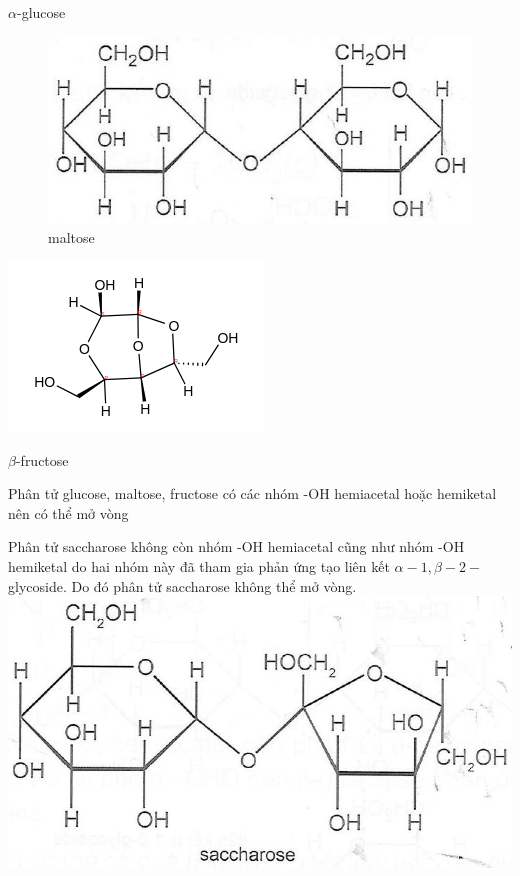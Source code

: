 \documentclass[10pt]{article}
\begin{document}
$\alpha$-glucose

\begin{figure}[h]
\begin{center}
  \includegraphics[width=\textwidth]{2025_10_23_b4e16b74380d0f7e7700g-038}
\captionsetup{labelformat=empty}
\caption{maltose}
\end{center}
\end{figure}

\includegraphics{smile-8bdbafc2142c4c27a739a469cb9d9a72a9e5bd1c}

$\beta$-fructose

Phân tử glucose, maltose, fructose có các nhóm -OH hemiacetal hoặc hemiketal nên có thể mở vòng

Phân tử saccharose không còn nhóm -OH hemiacetal cũng như nhóm -OH hemiketal do hai nhóm này đã tham gia phản ứng tạo liên kết $\alpha-1, \beta-2-$ glycoside. Do đó phân tử saccharose không thể mở vòng.\\
\includegraphics[max width=\textwidth, center]{2025_10_23_b4e16b74380d0f7e7700g-038(1)}
\end{document}
